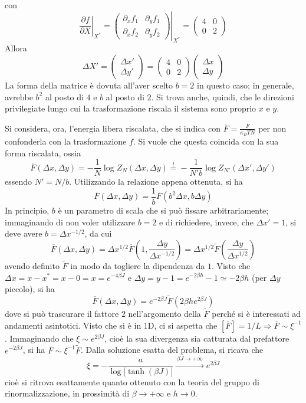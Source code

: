 \documentclass[11pt, a4paper]{scrartcl}
\theoremstyle{style}
\theoremstyle{style1}
\newcommand*\Eval[3]{\left.#1\right\rvert_{#2}^{#3}}
\numberwithin{equation}{subsection}
\begin{document}
con 
\[
	\Eval{\frac{\partial f}{\partial X} }{X^*}{} = \Eval{\begin{pmatrix} \partial _x f_1 & \partial _y f_1 \\ \partial _x f_2 & \partial _y f_2 \end{pmatrix} }{X^*}{} = \begin{pmatrix} 4 & 0 \\ 0 & 2 \end{pmatrix} 
\] 
Allora
\[
	\Delta X' = \begin{pmatrix} \Delta x' \\ \Delta y' \end{pmatrix} = \begin{pmatrix} 4 & 0 \\ 0 &2  \end{pmatrix} \begin{pmatrix} \Delta x \\ \Delta y \end{pmatrix} 
\] 
La forma della matrice \`e dovuta all'aver scelto $b=2$ in questo caso; in generale, avrebbe $b^2$ al posto di $4$ e $b$ al posto di $2$.
Si trova anche, quindi, che le direzioni privilegiate lungo cui la trasformazione riscala il sistema sono proprio $x$ e $y$.

Si considera, ora, l'energia libera riscalata, che si indica con $\overline{F} = \frac{F}{\kappa_BT N}$ per non confonderla con la trasformazione $f$.
Si vuole che questa coincida con la sua forma riscalata, ossia
\[
\overline{F}(\Delta x, \Delta y) = - \frac{1}{N} \log Z_N (\Delta x, \Delta y) \stackrel{!}{=} -\frac{1}{N'b} \log Z_{N'} \left(\Delta x' , \Delta y'\right) 
\] 
essendo $N' = N / b$.
Utilizzando la relazione appena ottenuta, si ha
\[
\overline{F}(\Delta x, \Delta y) = \frac{1}{b} \overline{F} \left(b^2 \Delta x , b \Delta y\right) 
\] 
In principio, $b$ \`e un parametro di scala che si pu\`o fissare arbitrariamente; immaginando di non voler utilizzare $b=2$ e di richiedere, invece, che $\Delta x' = 1$, si deve avere $b = \Delta x ^{-1 / 2}$, da cui
\[
\overline{F} (\Delta x , \Delta y) = \Delta x  ^{1 / 2} \overline{F}\left(1 ,  \frac{\Delta y}{\Delta x ^{-1 / 2}}\right) = \Delta x ^{1 / 2} \tilde{F}  \left(\frac{\Delta y}{\Delta x ^{1 / 2}}\right) 
\] 
avendo definito $\tilde{F}$ in modo da togliere la dipendenza da $1$.
Visto che $\Delta x = x-x^* = x - 0 = x = e^{-4\beta J}$ e $\Delta y = y-1 = e^{-2\beta  h}-1 \simeq -2\beta  h$ (per $\Delta y$ piccolo), si ha
\[
\overline{F} (\Delta x,\Delta y) = e^{-2 \beta J} \tilde{F} \left(2 \beta h e^{2\beta J}\right) 
\] 
dove si pu\`o trascurare il fattore $2$ nell'argomento della $\tilde{F}$ perch\'e si \`e interessati ad andamenti asintotici.
Visto che si \`e in 1D, ci si aspetta che $[\overline{F}] = 1 / L \Rightarrow \overline{F}\sim\xi^{-1} $.
Immaginando che $\xi \sim e^{2 \beta J}$, cio\`e la sua divergenza sia catturata dal prefattore $e^{-2 \beta J}$, si ha $\overline{F} \sim \xi ^{-1}\tilde{F}$.
Dalla soluzione esatta del problema, si ricava che
\[
	\xi  = - \frac{a}{\log\big[\tanh(\beta J)\big]} \xrightarrow{\ \beta J \to +\infty \ } e^{2 \beta J}
\] 
cio\`e si ritrova esattamente quanto ottenuto con la teoria del gruppo di rinormalizzazione, in prossimit\`a di $\beta \to +\infty$ e $h \to  0$.
\end{document}
